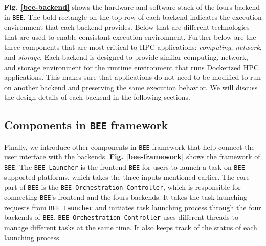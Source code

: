 \textbf{Fig. \ref{bee-backend}} shows the hardware and software stack of the fours backend in \texttt{BEE}. The bold rectangle on the top row of each backend indicates the execution environment that each backend provides. Below that are different technologies that are used to enable consistant execution environment. Further below are the three components that are most critical to HPC applications: \textit{computing}, \textit{network}, and \textit{storage}. Each backend is designed to provide similar computing, network, and storage environment for the runtime environment that runs Dockerized HPC applications. This makes sure that applications do not need to be modified to run on another backend and preserving the same execution behavior. We will discuss the design details of each backend in the following sections.

\subsection{Components in \texttt{BEE} framework}
Finally, we introduce other components in \texttt{BEE} framework that help connect the user interface with the backends. \textbf{Fig. \ref{bee-framework}} shows the framework of \texttt{BEE}. The \texttt{BEE Launcher} is the frontend \texttt{BEE} for users to launch a task on \texttt{BEE}-supported platforms, which takes the three inputs mentioned earlier. The core part of \texttt{BEE} is the \texttt{BEE Orchestration Controller}, which is responsible for connecting \texttt{BEE}'s frontend and the fours backends. It takes the task launching requests from \texttt{BEE Launcher} and initiates task launching process through the four backends of \texttt{BEE}. \texttt{BEE Orchestration Controller} uses different threads to manage different tasks at the same time. It also keeps track of the status of each launching process.








